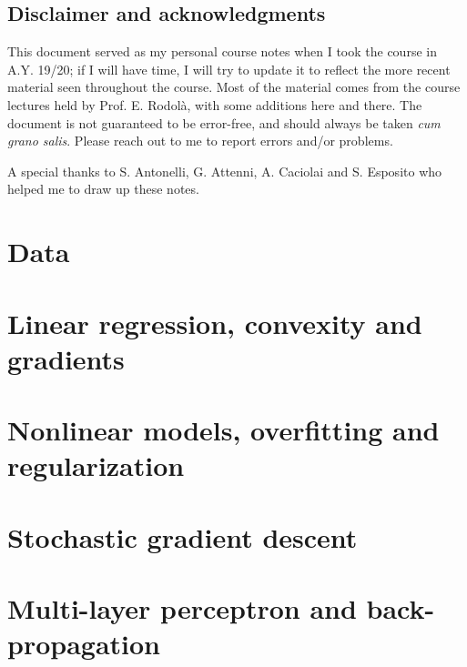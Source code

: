 


\maketitle

\section*{Disclaimer and acknowledgments}
This document served as my personal course notes when I took the course in A.Y. 19/20; if I will have time, I will try to update it to reflect the more recent material seen throughout the course. 
Most of the material comes from the course lectures held by Prof. E. Rodolà, with some additions here and there.
The document is not guaranteed to be error-free, and should always be taken \textit{cum grano salis}. Please reach out to me to report errors and/or problems.
  
A special thanks to S. Antonelli, G. Attenni, A. Caciolai and S. Esposito who helped me to draw up these notes.

\tableofcontents

\chapter{Data} 


\chapter{Linear regression, convexity and gradients}


\chapter{Nonlinear models, overfitting and regularization}


\chapter{Stochastic gradient descent} 


\chapter{Multi-layer perceptron and back-propagation} 


